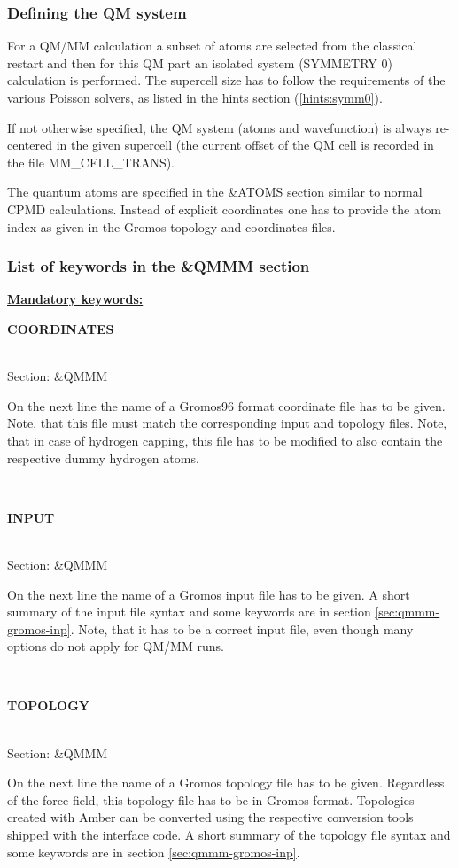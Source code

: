 \documentclass[twoside,10pt,titlepage,a4paper]{article}
\newcommand{\reflabel}[1]{\hypertarget{#1}}
\newcommand{\reflabel}[1]{\label{#1}}
\newcommand{\keyword}[5]{%
\vspace{1.0cm}
\begin{minipage}{15cm}
\reflabel{#1}{\textbf{\large #1}}%
\index{#1}%
\ \textbf{#2}%
\ \textbf{#3}%
\ \textit{#4}%
     \hfill\\\smallskip
     {Section: #5}
     \hfill\\\smallskip\vskip 10pt
\end{minipage}
}%
\newcommand{\desc}[1]{%
   \hspace*{\fill} \parbox{130mm}{\sloppy
                          {#1}%
                             }
     \hfill\\\smallskip
   }%
\newcommand{\desc}[1]{#1\vspace{1ex}}
\begin{document}
\subsubsection{Defining the QM system}
\label{sec:defining-qm-system}

For a QM/MM calculation a subset of atoms are selected from the
classical restart and then for this QM part an isolated system
(SYMMETRY 0) calculation is performed. The supercell size has
to follow the requirements of the various Poisson solvers, as
listed in the hints section (\ref{hints:symm0}).

If not otherwise specified, the QM system (atoms and wavefunction)
is always re-centered in the given supercell (the current offset of
the QM cell is recorded in the file MM\_CELL\_TRANS).

The quantum atoms are specified in the \&ATOMS section similar to normal
CPMD calculations. Instead of explicit coordinates one has to provide
the atom index as given in the Gromos topology and coordinates files.


\subsubsection{List of keywords in the \&QMMM section}

\textbf{\underline{Mandatory keywords:}}\\[-1cm]

\keyword{COORDINATES}{}{}{}{\&QMMM}
  \desc{On the next line the name of a Gromos96 format coordinate file
  has to be given. Note, that this file must match the corresponding
  input and topology files. Note, that in case of hydrogen capping, this
  file has to be modified to also contain the respective dummy hydrogen atoms.
}

\keyword{INPUT}{}{}{}{\&QMMM}
\desc{On the next line the name of a Gromos input file has to be
  given. A short summary of the input file syntax and some keywords
  are in section \ref{sec:qmmm-gromos-inp}.
  Note, that it has to be a correct input file, even though
  many options do not apply for QM/MM runs.}

\keyword{TOPOLOGY}{}{}{}{\&QMMM}
\desc{On the next line the name of a Gromos topology
  file has to be given. Regardless of the force field,
  this topology file has to be in Gromos format\cite{gromos96}.
  Topologies created with Amber %
  can be converted using the respective conversion tools shipped
  with the interface code.
  A short summary of the topology file syntax and some keywords
  are in section \ref{sec:qmmm-gromos-inp}.}
\end{document}
